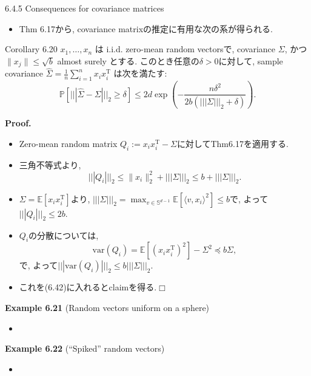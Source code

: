 \documentclass[unicode,aspectratio=169,11pt]{beamer}
\def\qed{\hfill $\Box$}
\newcommand{\ex}{\mathbb{E}}
\newcommand{\var}{\mathrm{var}}
\newcommand{\bb}{\mathbb}
\newcommand{\tr}{\mathrm{T}}
\begin{document}
\begin{frame}{6.4.5 Consequences for covariance matrices}{}
  \begin{itemize}
    \item Thm 6.17から, covariance matrixの推定に有用な次の系が得られる.
  \end{itemize}
  \begin{block}{Corollary 6.20}
    $x_1, \dots, x_n$ は i.i.d. zero-mean random vectorsで, covariance $\Sigma$, かつ $\| x_j \| \le \sqrt{b}$ almost surely とする.
    このとき任意の$\delta > 0$に対して, sample covariance $\widehat{\Sigma} = \frac{1}{n}\sum_{i=1}^n x_i x_i^{\tr}$ は次を満たす:
    \[
      \mathbb{P}\left[|||\widehat{\Sigma} - \Sigma|||_{2} \geq \delta\right]
      \leq 2 d \exp \left(-\frac{n \delta^{2}}{2 b\left(|||\Sigma|||_{2}+\delta\right)}\right).
      \tag{6.49}
    \]
  \end{block}
\end{frame}

\begin{frame}{}{}
  {\bf Proof.}
  \begin{itemize}
    \item Zero-mean random matrix $Q_i := x_i x_i^\tr - \Sigma$に対してThm6.17を適用する.
    \item 三角不等式より,
          \[
            ||| Q_i |||_2 \le \| x_i\|_2^2 + |||\Sigma|||_2 \le b + |||\Sigma|||_2.
          \]
    \item $\Sigma = \ex[x_i x_i^\tr]$より, $||| \Sigma|||_2 = \max_{v \in \bb{S}^{d-1}}\ex[\langle v, x_i\rangle^2] \le b$で, よって$|||Q_i|||_2 \le 2b$.
    \item $Q_i$の分散については,
          \[
            \var(Q_i)
            = \ex[(x_ix_i^\tr)^2] - \Sigma^2
            \preceq b\Sigma,
          \]
          で, よって$||| \var(Q_i)|||_2 \le b|||\Sigma|||_2$.
    \item これを(6.42)に入れるとclaimを得る.\qed
  \end{itemize}
\end{frame}

\begin{frame}{}{}
  {\bf Example 6.21} (Random vectors uniform on a sphere)
  \begin{itemize}
    \item 
  \end{itemize}
\end{frame}

\begin{frame}{}{}
  {\bf Example 6.22} (``Spiked'' random vectors)
  \begin{itemize}
    \item 
  \end{itemize}
\end{frame}
\end{document}
